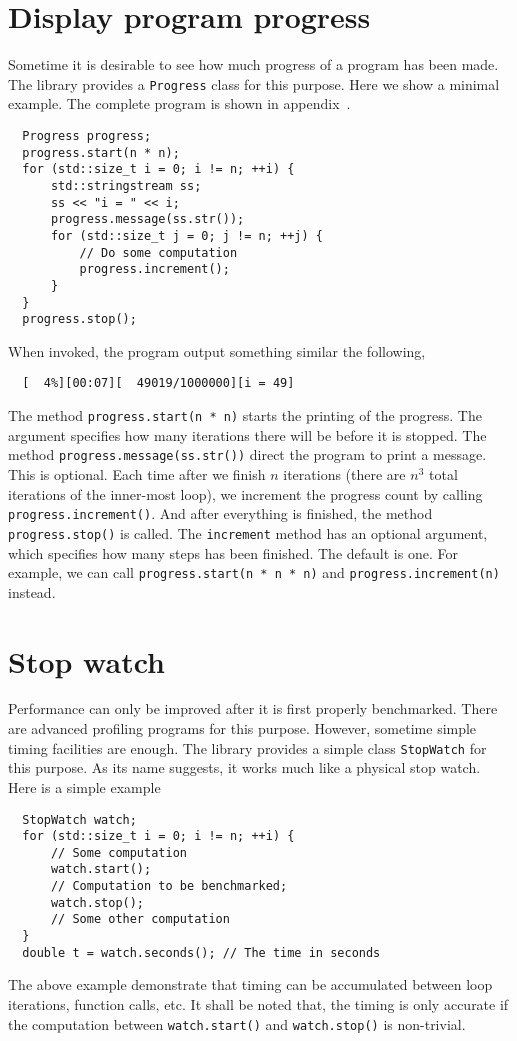 \section{Display program progress}
\label{sec:Display program progress}

Sometime it is desirable to see how much progress of a program has been made.
The library provides a \verb|Progress| class for this purpose. Here we show a
minimal example. The complete program is shown in
appendix~.
\begin{Verbatim}
  Progress progress;
  progress.start(n * n);
  for (std::size_t i = 0; i != n; ++i) {
      std::stringstream ss;
      ss << "i = " << i;
      progress.message(ss.str());
      for (std::size_t j = 0; j != n; ++j) {
          // Do some computation
          progress.increment();
      }
  }
  progress.stop();
\end{Verbatim}
When invoked, the program output something similar the following,
\begin{Verbatim}
  [  4%][00:07][  49019/1000000][i = 49]
\end{Verbatim}
The method \verb|progress.start(n * n)| starts the printing of the progress.
The argument specifies how many iterations there will be before it is stopped.
The method \verb|progress.message(ss.str())| direct the program to print a
message. This is optional. Each time after we finish $n$ iterations (there are
$n^3$ total iterations of the inner-most loop), we increment the progress count
by calling \verb|progress.increment()|. And after everything is finished, the
method \verb|progress.stop()| is called. The \verb|increment| method has an
optional argument, which specifies how many steps has been finished. The
default is one. For example, we can call \verb|progress.start(n * n * n)| and
\verb|progress.increment(n)| instead.

\section{Stop watch}
\label{sec:Stop watch}

Performance can only be improved after it is first properly benchmarked. There
are advanced profiling programs for this purpose. However, sometime simple
timing facilities are enough. The library provides a simple class
\verb|StopWatch| for this purpose. As its name suggests, it works much like a
physical stop watch. Here is a simple example
\begin{Verbatim}
  StopWatch watch;
  for (std::size_t i = 0; i != n; ++i) {
      // Some computation
      watch.start();
      // Computation to be benchmarked;
      watch.stop();
      // Some other computation
  }
  double t = watch.seconds(); // The time in seconds
\end{Verbatim}
The above example demonstrate that timing can be accumulated between loop
iterations, function calls, etc. It shall be noted that, the timing is only
accurate if the computation between \verb|watch.start()| and
\verb|watch.stop()| is non-trivial.
